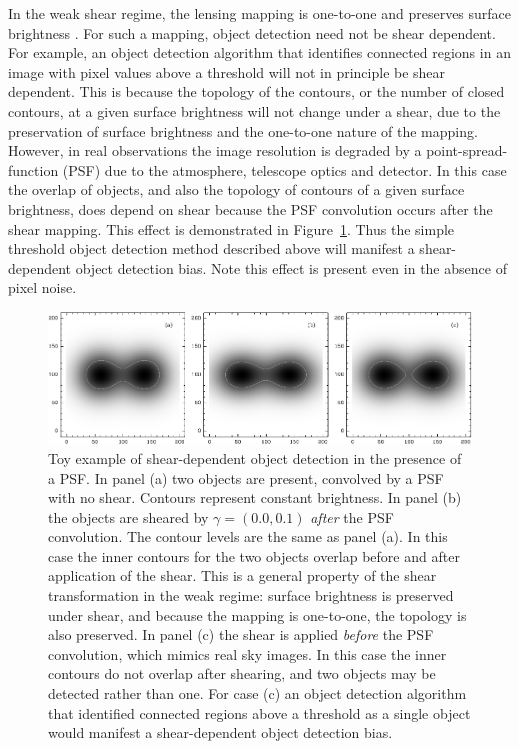 \documentclass[iop, twocolappendix, appendixfloats, numberedappendix, apj]{hackemulateapj}
\begin{document}
In the weak shear regime, the lensing mapping is one-to-one and preserves
surface brightness \citep{SchneiderBook92}. For such a mapping, object
detection need not be shear dependent. For example, an object detection
algorithm that identifies connected regions in an image with pixel values above
a threshold will not in principle be shear dependent.  This is because the
topology of the contours, or the number of closed contours, at a given surface
brightness will not change under a shear, due to the preservation of surface
brightness and the one-to-one nature of the mapping.  However, in real
observations the image resolution is degraded by a point-spread-function (PSF)
due to the atmosphere, telescope optics and detector. In this case the overlap
of objects, and also the topology of contours of a given surface brightness,
does depend on shear because the PSF convolution occurs after the shear
mapping.  This effect is demonstrated in Figure~\ref{fig:toy}.  Thus the simple
threshold object detection method described above will manifest a
shear-dependent object detection bias. Note this effect is present even in the
absence of pixel noise.

\begin{figure}
    \begin{center}
        \includegraphics[width=\textwidth]{figures/toy.pdf}

        \caption{ Toy example of shear-dependent object detection in the presence of
        a PSF.  In panel (a) two objects are present, convolved by a PSF with no
        shear.  Contours represent constant brightness.  In panel (b) the objects
        are sheared by $\gamma = (0.0, 0.1)$ {\em after} the PSF convolution.  The
        contour levels are the same as panel (a).  In this case the inner contours
        for the two objects overlap before and after application of the shear. This
        is a general property of the shear transformation in the weak regime:
        surface brightness is preserved under shear, and because the mapping is
        one-to-one, the topology is also preserved. In panel (c) the shear is
        applied {\em before} the PSF convolution, which mimics real sky images. In
        this case the inner contours do not overlap after shearing, and two objects
        may be detected rather than one.  For case (c) an object detection
        algorithm that identified connected regions above a threshold as a single
        object would manifest a shear-dependent object detection bias.
        \label{fig:toy} }
    \end{center}

\end{figure}
\end{document}

